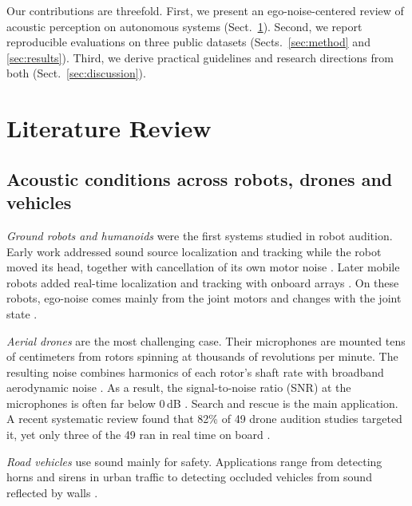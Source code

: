 \documentclass{svproc}
\begin{document}
Our contributions are threefold.
First, we present an ego-noise-centered review of acoustic perception on autonomous systems (Sect.~\ref{sec:review}).
Second, we report reproducible evaluations on three public datasets (Sects.~\ref{sec:method} and \ref{sec:results}).
Third, we derive practical guidelines and research directions from both (Sect.~\ref{sec:discussion}).


\section{Literature Review}\label{sec:review}
\subsection{Acoustic conditions across robots, drones and vehicles}
\emph{Ground robots and humanoids} were the first systems studied in robot audition.
Early work addressed sound source localization and tracking while the robot moved its head, together with cancellation of its own motor noise \cite{nakadai2000active}.
Later mobile robots added real-time localization and tracking with onboard arrays \cite{valin2007tracking}.
On these robots, ego-noise comes mainly from the joint motors and changes with the joint state \cite{ince2009template}.

\emph{Aerial drones} are the most challenging case.
Their microphones are mounted tens of centimeters from rotors spinning at thousands of revolutions per minute.
The resulting noise combines harmonics of each rotor's shaft rate with broadband aerodynamic noise \cite{yen2023ncm}.
As a result, the signal-to-noise ratio (SNR) at the microphones is often far below 0\,dB \cite{ruizespitia2018aira,gupta2025droneaudioset}.
Search and rescue is the main application.
A recent systematic review found that 82\% of 49 drone audition studies targeted it, yet only three of the 49 ran in real time on board \cite{chevtchenko2025review}.

\emph{Road vehicles} use sound mainly for safety.
Applications range from detecting horns and sirens in urban traffic \cite{marchegiani2017urban} to detecting occluded vehicles from sound reflected by walls \cite{schulz2021hearing}.
\end{document}
